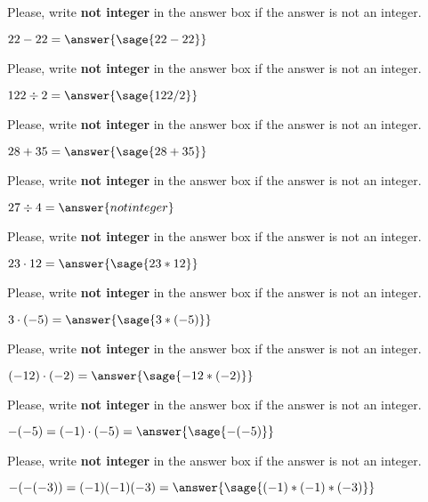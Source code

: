 \documentclass{ximera}
\begin{document}
\begin{problem}
Please, write \textbf{not integer} in the answer box if the answer is not an integer.

$22-22=\answer{\sage{22-22}}$
\end{problem}


\begin{problem}
Please, write \textbf{not integer} in the answer box if the answer is not an integer.

$122\div 2=\answer{\sage{122/2}}$
\end{problem}


\begin{problem}
Please, write \textbf{not integer} in the answer box if the answer is not an integer.

$28+35=\answer{\sage{28+35}}$
\end{problem}



\begin{problem}
Please, write \textbf{not integer} in the answer box if the answer is not an integer.

$27\div 4=\answer{not integer}$
\end{problem}


\begin{problem}
Please, write \textbf{not integer} in the answer box if the answer is not an integer.

$23\cdot 12=\answer{\sage{23*12}}$
\end{problem}

\begin{problem}
Please, write \textbf{not integer} in the answer box if the answer is not an integer.

$3\cdot (-5)=\answer{\sage{3*(-5)}}$
\end{problem}


\begin{problem}
Please, write \textbf{not integer} in the answer box if the answer is not an integer.

$(-12)\cdot(-2)=\answer{\sage{-12*(-2)}}$
\end{problem}


\begin{problem}
Please, write \textbf{not integer} in the answer box if the answer is not an integer.

$-(-5)=(-1)\cdot(-5)=\answer{\sage{-(-5)}}$
\end{problem}


\begin{problem}
Please, write \textbf{not integer} in the answer box if the answer is not an integer.

$-(-(-3))=(-1)(-1)(-3)=\answer{\sage{(-1)*(-1)*(-3)}}$
\end{problem}
\end{document}
